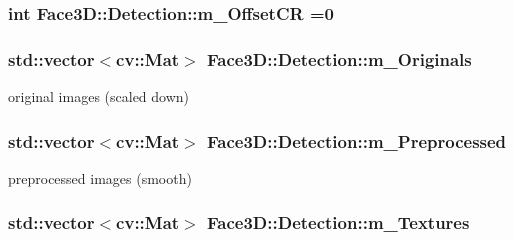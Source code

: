 \subsubsection[{\texorpdfstring{m\+\_\+\+Offset\+CR}{m_OffsetCR}}]{\setlength{\rightskip}{0pt plus 5cm}int Face3\+D\+::\+Detection\+::m\+\_\+\+Offset\+CR =0\hspace{0.3cm}{\ttfamily [private]}}\hypertarget{class_face3_d_1_1_detection_a0507241bc6482cebf174e53ea311c885}{}\label{class_face3_d_1_1_detection_a0507241bc6482cebf174e53ea311c885}
\subsubsection[{\texorpdfstring{m\+\_\+\+Originals}{m_Originals}}]{\setlength{\rightskip}{0pt plus 5cm}std\+::vector$<$cv\+::\+Mat$>$ Face3\+D\+::\+Detection\+::m\+\_\+\+Originals\hspace{0.3cm}{\ttfamily [private]}}\hypertarget{class_face3_d_1_1_detection_a237f409f79b8417f906732dc522322a8}{}\label{class_face3_d_1_1_detection_a237f409f79b8417f906732dc522322a8}


original images (scaled down) 

\subsubsection[{\texorpdfstring{m\+\_\+\+Preprocessed}{m_Preprocessed}}]{\setlength{\rightskip}{0pt plus 5cm}std\+::vector$<$cv\+::\+Mat$>$ Face3\+D\+::\+Detection\+::m\+\_\+\+Preprocessed\hspace{0.3cm}{\ttfamily [private]}}\hypertarget{class_face3_d_1_1_detection_a022bcdfdcfab58bcd2bb4f448d583b3c}{}\label{class_face3_d_1_1_detection_a022bcdfdcfab58bcd2bb4f448d583b3c}


preprocessed images (smooth) 

\subsubsection[{\texorpdfstring{m\+\_\+\+Textures}{m_Textures}}]{\setlength{\rightskip}{0pt plus 5cm}std\+::vector$<$cv\+::\+Mat$>$ Face3\+D\+::\+Detection\+::m\+\_\+\+Textures\hspace{0.3cm}{\ttfamily [private]}}\hypertarget{class_face3_d_1_1_detection_a5dbd240320bc7a4c1661b63e23bee777}{}\label{class_face3_d_1_1_detection_a5dbd240320bc7a4c1661b63e23bee777}


